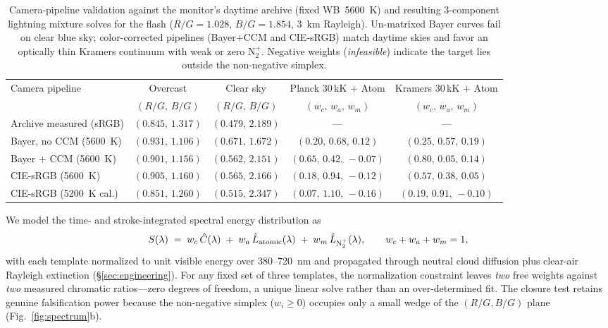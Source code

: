 \documentclass[11pt,a4paper]{article}
\newcommand{\Ntp}{N$_2^+$}
\begin{document}
\begin{table}[t]
  \centering
  \footnotesize
  \setlength{\tabcolsep}{4.5pt}
  \caption{Camera-pipeline validation against the monitor's daytime archive
  (fixed WB~5600~K) and resulting 3-component lightning mixture solves for the
  flash ($R/G=1.028$, $B/G=1.854$, 3~km Rayleigh). Un-matrixed Bayer curves
  fail on clear blue sky; color-corrected pipelines (Bayer$+$CCM and CIE-sRGB)
  match daytime skies and favor an optically thin Kramers continuum with weak
  or zero \Ntp{}. Negative weights (\emph{infeasible}) indicate the target
  lies outside the non-negative simplex.}
  \label{tab:validation}
  \begin{tabular}{@{}lcccc@{}}
    \toprule
    Camera pipeline & Overcast & Clear sky & Planck 30\,kK $+$ Atom & Kramers 30\,kK $+$ Atom \\
    & $(R/G,\,B/G)$ & $(R/G,\,B/G)$ & $(w_c,\,w_a,\,w_m)$ & $(w_c,\,w_a,\,w_m)$ \\
    \midrule
    Archive measured (sRGB) & $(0.845,\,1.317)$ & $(0.479,\,2.189)$ & --- & --- \\
    \midrule
    Bayer, no CCM (5600~K) & $(0.931,\,1.106)$ & $(0.671,\,1.672)$ & $(0.20,\,0.68,\,0.12)$ & $(0.25,\,0.57,\,0.19)$ \\
    Bayer $+$ CCM (5600~K) & $(0.901,\,1.156)$ & $(0.562,\,2.151)$ & $(0.65,\,0.42,\,-0.07)$ & $(0.80,\,0.05,\,0.14)$ \\
    CIE-sRGB (5600~K)      & $(0.905,\,1.160)$ & $(0.565,\,2.166)$ & $(0.18,\,0.94,\,-0.12)$ & $(0.57,\,0.38,\,0.05)$ \\
    CIE-sRGB (5200~K cal.) & $(0.851,\,1.260)$ & $(0.515,\,2.347)$ & $(0.07,\,1.10,\,-0.16)$ & $(0.19,\,0.91,\,-0.10)$ \\
    \bottomrule
  \end{tabular}
\end{table}

We model the time- and stroke-integrated spectral energy distribution as
\begin{equation}
  S(\lambda) \;=\; w_c\,\hat{C}(\lambda)
  \;+\; w_a\,\hat{L}_{\rm atomic}(\lambda)
  \;+\; w_m\,\hat{L}_{\mathrm{N}_2^+}(\lambda),
  \qquad w_c+w_a+w_m=1,
\end{equation}
with each template normalized to unit visible energy over 380--720~nm and
propagated through neutral cloud diffusion plus clear-air Rayleigh extinction
(\S\ref{sec:engineering}). For any fixed set of three templates, the
normalization constraint leaves \emph{two} free weights against \emph{two}
measured chromatic ratios---zero degrees of freedom, a unique linear solve
rather than an over-determined fit. The closure test retains genuine
falsification power because the non-negative simplex ($w_i\ge 0$) occupies
only a small wedge of the $(R/G,B/G)$ plane (Fig.~\ref{fig:spectrum}b).
\end{document}
